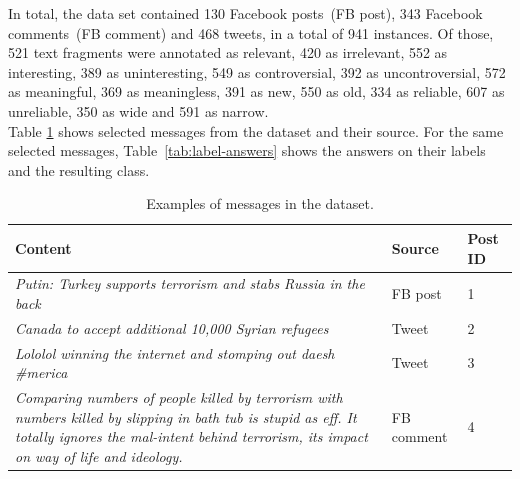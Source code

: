 In total, the data set contained 130 Facebook posts~(FB post), 343 Facebook comments~(FB comment) and 468 tweets, in a total of 941 instances. Of those, 521 text fragments were annotated as relevant, 420 as irrelevant, 552 as interesting, 389 as uninteresting, 549 as controversial, 392 as uncontroversial, 572 as meaningful, 369 as meaningless, 391 as new, 550 as old, 334 as reliable, 607 as unreliable, 350 as wide and 591 as narrow. \\
Table \ref{tab:text-examples} shows selected messages from the dataset and their source. For the same selected messages, Table~\ref{tab:label-answers} shows the answers on their labels and the resulting class.

\begin{table}[H]
\centering
\footnotesize
\begin{tabular}{|p{7cm}|l|l|}
\hline
\textbf{Content} & \textbf{Source} & \textbf{Post ID}\\
\hline
\scriptsize \it Putin: Turkey supports terrorism and stabs Russia in the back & FB post  & 1
\\
\scriptsize \it Canada to accept additional 10,000 Syrian refugees & Tweet & 2
\\
\scriptsize \it Lololol winning the internet and stomping out daesh \#merica & Tweet &3 
\\
\scriptsize \it Comparing numbers of people killed by terrorism with numbers killed by slipping in bath tub is stupid as eff. It totally ignores the mal-intent behind terrorism, its impact on way of life and ideology. & FB comment & 4
\\
\hline
\end{tabular}
\caption{Examples of messages in the dataset.}
\label{tab:text-examples}
\end{table}

